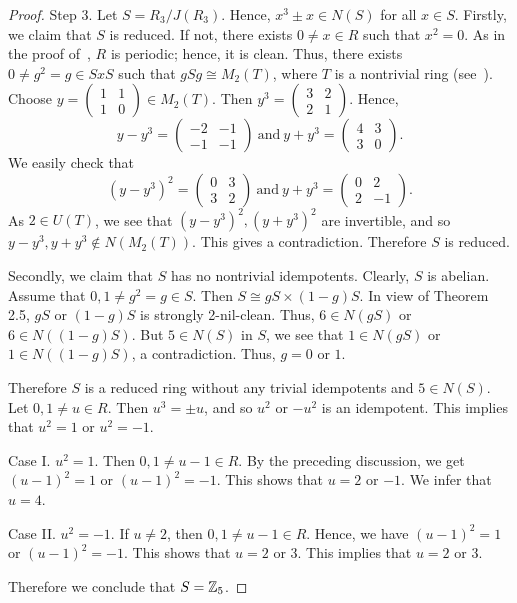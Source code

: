 \documentclass[12pt, reqno]{amsart}
\numberwithin{equation}{section}
\begin{document}
\begin{proof}
Step 3. Let $S=R_3/J(R_3)$. Hence, $x^3\pm x\in N(S)$ for all $x\in S$. Firstly, we claim that $S$ is reduced. If not, there exists $0\neq x\in R$ such that $x^2=0$. As in the proof of~\cite[Proposition 3.5]{CS}, $R$ is periodic; hence, it is clean. Thus, there exists $0\neq g^2=g\in SxS$ such that $gSg\cong M_2(T)$, where $T$ is a nontrivial ring (see~\cite[Lemma 2.7]{Z}). Choose $y=\left(
\begin{array}{cc}
1&1\\
1&0
\end{array}
\right)\in M_2(T)$. Then $y^3=\left(
\begin{array}{cc}
3&2\\
2&1
\end{array}
\right).$ Hence,
$$y-y^3=\left(
\begin{array}{cc}
-2&-1\\
-1&-1
\end{array}
\right)~\mbox{and}~y+y^3=\left(
\begin{array}{cc}
4&3\\
3&0
\end{array}
\right).$$ We easily check that
$$(y-y^3)^2=\left(
\begin{array}{cc}
0&3\\
3&2
\end{array}
\right)~\mbox{and}~y+y^3=\left(
\begin{array}{cc}
0&2\\
2&-1
\end{array}
\right).$$ As $2\in U(T)$, we see that $(y-y^3)^2, (y+y^3)^2$ are invertible, and so $y-y^3,y+y^3\not\in N(M_2(T))$. This gives a contradiction. Therefore $S$ is reduced.

Secondly, we claim that $S$ has no nontrivial idempotents. Clearly, $S$ is abelian. Assume that $0,1\neq g^2=g\in S$. Then $S\cong gS\times (1-g)S$. In view of Theorem 2.5, $gS$ or $(1-g)S$ is strongly 2-nil-clean. Thus, $6\in N(gS)$ or $6\in N((1-g)S)$. But $5\in N(S)$ in $S$, we see that $1\in N(gS)$ or $1\in N((1-g)S)$, a contradiction. Thus, $g=0$ or $1$.

Therefore $S$ is a reduced ring without any trivial idempotents and $5\in N(S)$. Let $0,1\neq u\in R$. Then $u^3=\pm u$, and so $u^2$ or $-u^2$ is an idempotent. This implies that $u^2=1$ or $u^2=-1$.

Case I. $u^2=1$. Then $0,1\neq u-1\in R$. By the preceding discussion, we get $(u-1)^2=1$ or $(u-1)^2=-1$. This shows that
$u=2$ or $-1$. We infer that $u=4$.

Case II. $u^2=-1$. If $u\neq 2$, then $0,1\neq u-1\in R$. Hence, we have $(u-1)^2=1$ or $(u-1)^2=-1$.
This shows that $u=2$ or $3$. This implies that $u=2$ or $3$.

Therefore we conclude that $S={\Bbb Z}_5$.\end{proof}
\end{document}
